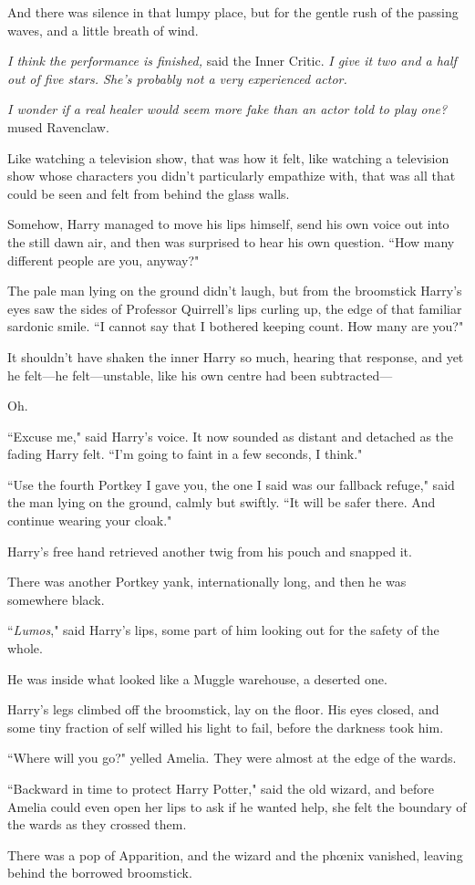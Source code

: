And there was silence in that lumpy place, but for the gentle rush of the passing waves, and a little breath of wind.

\emph{I think the performance is finished,} said the Inner Critic. \emph{I give it two and a half out of five stars. She's probably not a very experienced actor.}

\emph{I wonder if a real healer would seem more fake than an actor told to play one?} mused Ravenclaw.

Like watching a television show, that was how it felt, like watching a television show whose characters you didn't particularly empathize with, that was all that could be seen and felt from behind the glass walls.

Somehow, Harry managed to move his lips himself, send his own voice out into the still dawn air, and then was surprised to hear his own question. ``How many different people are you, anyway?"

The pale man lying on the ground didn't laugh, but from the broomstick Harry's eyes saw the sides of Professor Quirrell's lips curling up, the edge of that familiar sardonic smile. ``I cannot say that I bothered keeping count. How many are you?"

It shouldn't have shaken the inner Harry so much, hearing that response, and yet he felt—he felt—unstable, like his own centre had been subtracted—

Oh.

``Excuse me," said Harry's voice. It now sounded as distant and detached as the fading Harry felt. ``I'm going to faint in a few seconds, I think."

``Use the fourth Portkey I gave you, the one I said was our fallback refuge," said the man lying on the ground, calmly but swiftly. ``It will be safer there. And continue wearing your cloak."

Harry's free hand retrieved another twig from his pouch and snapped it.

There was another Portkey yank, internationally long, and then he was somewhere black.

``\emph{Lumos}," said Harry's lips, some part of him looking out for the safety of the whole.

He was inside what looked like a Muggle warehouse, a deserted one.

Harry's legs climbed off the broomstick, lay on the floor. His eyes closed, and some tiny fraction of self willed his light to fail, before the darkness took him.

\later

``Where will you go?" yelled Amelia. They were almost at the edge of the wards.

``Backward in time to protect Harry Potter," said the old wizard, and before Amelia could even open her lips to ask if he wanted help, she felt the boundary of the wards as they crossed them.

There was a pop of Apparition, and the wizard and the phœnix vanished, leaving behind the borrowed broomstick.

